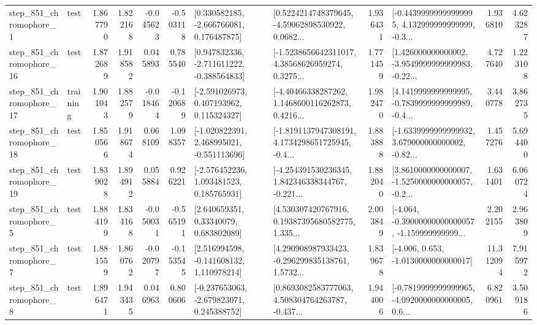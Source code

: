 \begin{tabular}{llrrrrllrlrr}
   step\_851\_chromophore\_1 &      test &      1.867790 &    1.822168 &     -0.045623 & -0.503118 &    [0.330582185, -2.666766081, 0.176487875] &  [0.5224214748379645, -4.59062898530922, 0.0682... &       1.936431 &  [-0.44399999999999995, 4.132999999999999, -0.3... &            1.936810 &          4.623287 \\
  step\_851\_chromophore\_16 &      test &      1.872689 &    1.918582 &      0.045893 &  0.785540 &   [0.947832336, -2.711611222, -0.388564833] &  [-1.5238656642311017, 4.38568626959274, 0.3275... &       1.771459 &  [1.426000000000002, -3.9549999999999983, -0.22... &            4.727640 &          1.223108 \\
  step\_851\_chromophore\_17 &  training &      1.901043 &    1.882579 &     -0.018464 & -0.120689 &    [-2.591026973, 0.407193962, 0.115324327] &  [-4.40466338287262, 1.1468600116262873, 0.4216... &       1.982470 &  [4.1419999999999995, -0.7839999999999989, -0.4... &            3.440778 &          3.862735 \\
  step\_851\_chromophore\_18 &      test &      1.850566 &    1.918674 &      0.068109 &  1.098357 &   [-1.020822391, 2.468995021, -0.551113696] &  [-1.8191137947308191, 4.1734298651725945, -0.4... &       1.883888 &  [-1.6339999999999932, 3.679000000000002, -0.82... &            1.457276 &          5.694400 \\
  step\_851\_chromophore\_19 &      test &      1.839028 &    1.894912 &      0.055884 &  0.926221 &    [-2.576452236, 1.093481523, 0.185765931] &  [-4.254391530236345, 1.842346338344767, -0.221... &       1.882040 &  [3.8610000000000007, -1.5250000000000057, -0.2... &            1.631401 &          6.060724 \\
   step\_851\_chromophore\_5 &      test &      1.884199 &    1.834168 &     -0.050031 & -0.565191 &      [2.640659351, 0.33340079, 0.683802089] &  [4.530307420767916, 0.19387395680582775, 1.335... &       2.003849 &  [-4.064, -0.39000000000000057, -1.159999999999... &            2.202155 &          2.963809 \\
   step\_851\_chromophore\_7 &      test &      1.881559 &    1.860762 &     -0.020797 & -0.153545 &    [2.516994598, -0.141608132, 1.110978214] &  [4.290908987933423, -0.296299835138761, 1.5732... &       1.839678 &               [-4.006, 0.653, -1.0130000000000017] &           11.312094 &          7.915972 \\
   step\_851\_chromophore\_8 &      test &      1.896471 &    1.943435 &      0.046963 &  0.800606 &   [-0.237653063, -2.679823071, 0.245388752] &  [0.8693082583777063, 4.508304764263787, -0.437... &       1.944006 &  [-0.7819999999999965, -4.0920000000000005, 0.6... &            6.820961 &          3.509186 \\

\end{tabular}
